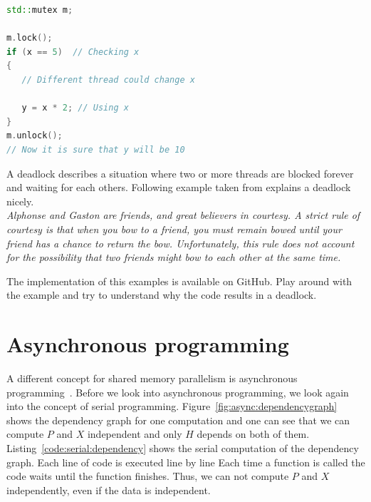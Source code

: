 \documentclass[11pt,fleqn]{book} %
\begin{document}
\begin{lstlisting}[language=c++,caption={Example for the race condition.\label{code:racecondition}},float,floatplacement=tb]
std::mutex m;

m.lock();
if (x == 5)  // Checking x
{
   // Different thread could change x 
      
   y = x * 2; // Using x
}
m.unlock();
// Now it is sure that y will be 10
\end{lstlisting}


A deadlock describes a situation where two or more threads are blocked forever and waiting for each others. Following example taken from explains a deadlock nicely. \\

\textit{Alphonse and Gaston are friends, and great believers in courtesy. A strict rule of courtesy is that when you bow to a friend, you must remain bowed until your friend has a chance to return the bow. Unfortunately, this rule does not account for the possibility that two friends might bow to each other at the same time.}

\begin{exercise}
The implementation of this examples is available on GitHub. Play around with the example and try to understand why the code results in a deadlock. 
\end{exercise}

\chapter{Asynchronous programming}
\label{sec:async:coding}
A different concept for shared memory parallelism is asynchronous programming~\cite{williams2012c++}. Before we look into asynchronous programming, we look again into the concept of serial programming. Figure~\ref{fig:async:dependencygraph} shows the dependency graph for one computation and one can see that we can compute $P$ and $X$ independent and only $H$ depends on both of them. Listing~\ref{code:serial:dependency} shows the serial computation of the dependency graph. Each line of code is executed line by line Each time a function is called the code waits until the function finishes. Thus, we can not compute $P$ and $X$ independently, even if the data is independent. 
\end{document}
